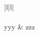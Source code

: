 \documentclass{article}
\begin{document}
\begin{tabular}{|l|l|}
\hline
{} \\ \hline
{} \\ \hline
yyy & zzz \\ \hline
\end{tabular}
\end{document}
